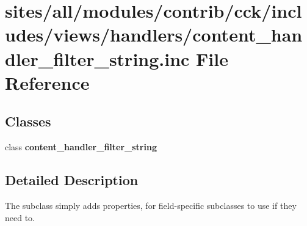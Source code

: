 \hypertarget{content__handler__filter__string_8inc}{
\section{sites/all/modules/contrib/cck/includes/views/handlers/content\_\-handler\_\-filter\_\-string.inc File Reference}
\label{content__handler__filter__string_8inc}
}
\subsection*{Classes}
\begin{CompactItemize}
\item 
class \textbf{content\_\-handler\_\-filter\_\-string}
\end{CompactItemize}


\subsection{Detailed Description}
The subclass simply adds properties, for field-specific subclasses to use if they need to. 